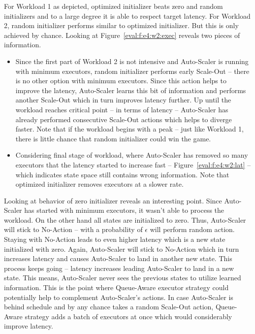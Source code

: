 For Workload 1 as depicted, optimized initializer beats zero and random initializers and to a large degree it is able to respect target latency. For Workload 2, random initializer performs similar to optimized initializer. But this is only achieved by chance. Looking at Figure~\ref{eval:f:e4:w2:exec} reveals two pieces of information.
\begin{itemize}
    \item Since the first part of Workload 2 is not intensive and Auto-Scaler is running with minimum executors, random initializer performs early Scale-Out -- there is no other option with minimum executors. Since this action helps to improve the latency, Auto-Scaler learns this bit of information and performs another Scale-Out which in turn improves latency further. Up until the workload reaches critical point -- in terms of latency -- Auto-Scaler has already performed consecutive Scale-Out actions which helps to diverge faster. Note that if the workload begins with a peak -- just like Workload 1, there is little chance that random initializer could win the game.
    \item Considering final stage of workload, where Auto-Scaler has removed so many executors that the latency started to increase fast -- Figure~\ref{eval:f:e4:w2:lat} -- which indicates state space still contains wrong information. Note that optimized initializer removes executors at a slower rate.
\end{itemize}

Looking at behavior of zero initializer reveals an interesting point. Since Auto-Scaler has started with minimum executors, it wasn't able to process the workload. On the other hand all states are initialized to zero. Thus, Auto-Scaler will stick to No-Action -- with a probability of $\epsilon$ will perform random action. Staying with No-Action leads to even higher latency which is a new state initialized with zero. Again, Auto-Scaler will stick to No-Action which in turn increases latency and causes Auto-Scaler to land in another new state. This process keeps going -- latency increases leading Auto-Scaler to land in a new state. This means, Auto-Scaler never sees the previous states to utilize learned information. This is the point where Queue-Aware executor strategy could potentially help to complement Auto-Scaler's actions. In case Auto-Scaler is behind schedule and by any chance takes a random Scale-Out action, Queue-Aware strategy adds a batch of executors at once which would considerably improve latency.

